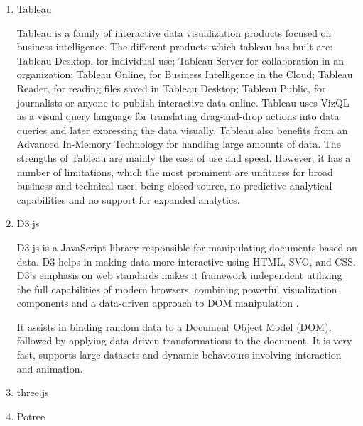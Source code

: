 \begin{enumerate}
\item {} 
Tableau

\label{\detokenize{i524/technologies:id149}}{\hyperref[\detokenize{i524/technologies:www-tableau-tutorial}]{\sphinxcrossref{{[}130{]}}}} Tableau is a family of interactive
data visualization products focused on business intelligence. The
different products which tableau has built are: Tableau Desktop,
for individual use; Tableau Server for collaboration in an
organization; Tableau Online, for Business Intelligence in the
Cloud; Tableau Reader, for reading files saved in Tableau Desktop;
Tableau Public, for journalists or anyone to publish interactive
data online.  \label{\detokenize{i524/technologies:id150}}{\hyperref[\detokenize{i524/technologies:www-tableau-web}]{\sphinxcrossref{{[}131{]}}}} Tableau uses VizQL as a
visual query language for translating drag-and-drop actions into
data queries and later expressing the data visually. Tableau also
benefits from an Advanced In-Memory Technology for handling large
amounts of data.  The strengths of Tableau are mainly the ease of
use and speed.  However, it has a number of limitations, which the
most prominent are unfitness for broad business and technical
user, being closed-source, no predictive analytical capabilities
and no support for expanded analytics.

\item {} 
D3.js

D3.js is a JavaScript library responsible for manipulating
documents based on data. D3 helps in making data more interactive
using HTML, SVG, and CSS. D3’s emphasis on web standards makes it
framework independent utilizing the full capabilities of modern
browsers, combining powerful visualization components and a
data-driven approach to DOM manipulation \label{\detokenize{i524/technologies:id151}}{\hyperref[\detokenize{i524/technologies:www-d3}]{\sphinxcrossref{{[}132{]}}}}.

It assists in binding random data to a Document Object Model
(DOM), followed by applying data-driven transformations to the
document. It is very fast, supports large datasets and dynamic
behaviours involving interaction and animation.

\item {} 
three.js

\item {} 
Potree


\end{enumerate}
